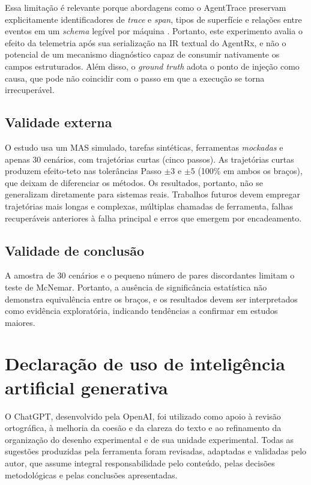 \documentclass[sigconf]{acmart}
\begin{document}
Essa limitação é relevante porque abordagens como o AgentTrace preservam explicitamente identificadores de
\textit{trace} e \textit{span}, tipos de superfície e relações entre eventos em um \textit{schema} legível por máquina
\cite{alsayyad2026agenttrace}. Portanto, este experimento avalia o efeito da telemetria após sua serialização na IR
textual do AgentRx, e não o potencial de um mecanismo diagnóstico capaz de consumir nativamente os campos estruturados.
Além disso, o \textit{ground truth} adota o ponto de injeção como causa, que pode não coincidir com o passo em que a
execução se torna irrecuperável.

\subsection{Validade externa}
O estudo usa um MAS simulado, tarefas sintéticas, ferramentas \textit{mockadas} e apenas 30 cenários, com trajetórias
curtas (cinco passos). As trajetórias curtas produzem efeito-teto nas tolerâncias Passo $\pm 3$ e $\pm 5$ (100\% em
ambos os braços), que deixam de diferenciar os métodos. Os resultados, portanto, não se generalizam diretamente para
sistemas reais. Trabalhos futuros devem empregar trajetórias mais longas e complexas, múltiplas chamadas de ferramenta,
falhas recuperáveis anteriores à falha principal e erros que emergem por encadeamento.

\subsection{Validade de conclusão}

A amostra de 30 cenários e o pequeno número de pares discordantes limitam o teste de McNemar. Portanto, a ausência de
significância estatística não demonstra equivalência entre os braços, e os resultados devem ser interpretados como
evidência exploratória, indicando tendências a confirmar em estudos maiores.

\section*{Declaração de uso de inteligência artificial generativa}

O ChatGPT, desenvolvido pela OpenAI, foi utilizado como apoio à revisão ortográfica, à melhoria da coesão e da clareza
do texto e ao refinamento da organização do desenho experimental e de sua unidade experimental. Todas as sugestões
produzidas pela ferramenta foram revisadas, adaptadas e validadas pelo autor, que assume integral responsabilidade pelo
conteúdo, pelas decisões metodológicas e pelas conclusões apresentadas.



\end{document}
